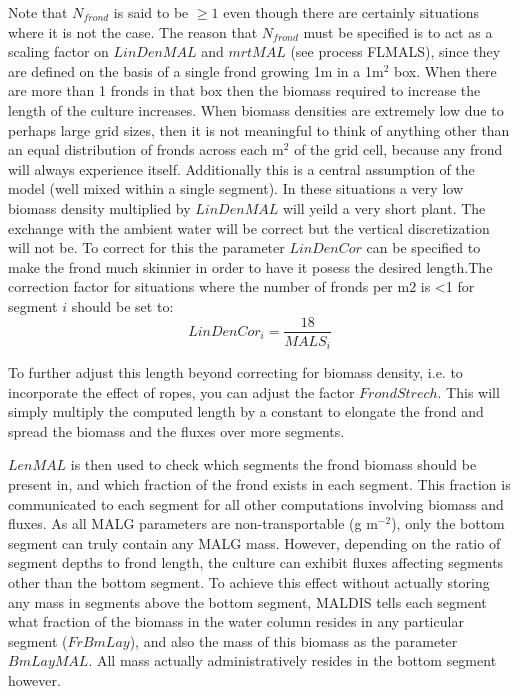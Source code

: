 \documentclass{deltares_manual}
\begin{document}
Note that $N_{frond}$ is said to be $\ge 1$ even though there are certainly situations where it is not the case. The reason that $N_{frond}$ must be specified is to act as a scaling factor on $LinDenMAL$ and $mrtMAL$ (see process FLMALS), since they are defined on the basis of a single frond growing 1m in a 1m$^{2}$ box. When there are more than 1 fronds in that box then the biomass required to increase the length of the culture increases. When biomass densities are extremely low due to perhaps large grid sizes, then it is not meaningful to think of anything other than an equal distribution of fronds across each m$^{2}$ of the grid cell, because any frond will always experience itself. Additionally this is a central assumption of the model (well mixed within a single segment). In these situations a very low biomass density multiplied by $LinDenMAL$ will yeild a very short plant. The exchange with the ambient water will be correct but the vertical discretization will not be. To correct for this the parameter $LinDenCor$ can be specified to make the frond much skinnier in order to have it posess the desired length.The correction factor  for situations where the number of fronds per m${2}$ is \textless 1 for segment $i$ should be set to:
\begin{equation}
	LinDenCor_i = \frac{18}{MALS_i}
\end{equation}

To further adjust this length beyond correcting for biomass density, i.e. to incorporate the effect of ropes,  you can adjust the factor $FrondStrech$. This will simply multiply the computed length by a constant to elongate the frond and spread the biomass and the fluxes over more segments.

$LenMAL$ is then used to check which segments the frond biomass should be present in, and which fraction of the frond exists in each segment. This fraction is communicated to each segment for all other computations involving biomass and fluxes. As all MALG parameters are non-transportable (g m$^{-2}$), only the bottom segment can truly contain any MALG mass. However, depending on the ratio of segment depths to frond length, the culture can exhibit fluxes affecting segments other than the bottom segment. To achieve this effect without actually storing any mass in segments above the bottom segment, MALDIS tells each segment what fraction of the biomass in the water column resides in any particular segment ($FrBmLay$), and also the mass of this biomass as the parameter $BmLayMAL$. All mass actually administratively resides in the bottom segment however.
\end{document}
